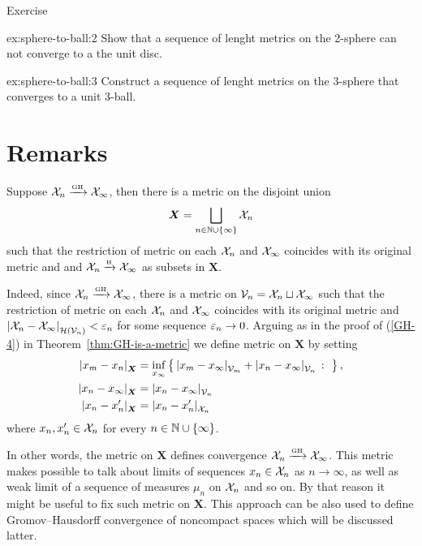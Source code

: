 \begin{thm}{Exercise}\label{ex:sphere-to-ball}
\begin{subthm}{ex:sphere-to-ball:2}
Show that a sequence of lenght metrics on the 2-sphere can not converge to a the unit disc.
\end{subthm}

\begin{subthm}{ex:sphere-to-ball:3}
Construct a sequence of lenght metrics on the 3-sphere that converges to a unit 3-ball.
\end{subthm}

\end{thm}

\section{Remarks}

Suppose $\mathcal{X}_n\xrightarrow{\mbox{\tiny GH}} \mathcal{X}_\infty$, then there is a metric on the disjoint union 
\[\bm{X}=\bigsqcup_{n\in \mathbb{N}\cup\{\infty\}} \mathcal{X}_n\]
such that the restriction of metric on each $\mathcal{X}_n$ and $\mathcal{X}_\infty$ coincides with its original metric and and $\mathcal{X}_n\xrightarrow{\mbox{\tiny H}} \mathcal{X}_\infty$ as subsets in $\bm{X}$.

Indeed, since $\mathcal{X}_n\xrightarrow{\mbox{\tiny GH}} \mathcal{X}_\infty$, there is a metric on $\mathcal{V}_n=\mathcal{X}_n\sqcup \mathcal{X}_\infty$ such that the restriction of metric on each $\mathcal{X}_n$ and $\mathcal{X}_\infty$ coincides with its original metric and $\dist{\spc{X}_n}{\spc{X}_\infty}{\mathcal{H}(\spc{V}_n)}<\eps_n$ for some sequence $\varepsilon_n\to 0$.
Arguing as in the proof of (\ref{GH-4}) in Theorem~\ref{thm:GH-is-a-metric}
we define metric on $\bm{X}$ by setting 
\begin{align*}
\dist{x_m}{x_n}{\bm{X}}&=\inf_{x_\infty}\set{\dist{x_m}{x_\infty}{\spc{V}_m}+\dist{x_n}{x_\infty}{\spc{V}_n}}{},
\\
\dist{x_n}{x_\infty}{\bm{X}}&=\dist{x_n}{x_\infty}{\spc{V}_n}
\\
\dist{x_n}{x'_n}{\bm{X}}&=\dist{x_n}{x_n'}{\spc{X}_n}
\end{align*}
where $x_n,x_n'\in\mathcal{X}_n$ for every $n\in \mathbb{N}\cup\{\infty\}$.

In other words, the metric on $\bm{X}$ defines convergence $\mathcal{X}_n\xrightarrow{\mbox{\tiny GH}} \mathcal{X}_\infty$.
This metric makes possible to talk about limits of sequences $x_n\in \mathcal{X}_n$ as $n\to\infty$, as well as weak limit of a sequence of measures $\mu_n$ on $\mathcal{X}_n$ and so on.
By that reason it might be useful to fix such metric on $\bm{X}$.
This approach can be also used to define Gromov--Hausdorff convergence of noncompact spaces which will be discussed latter.

